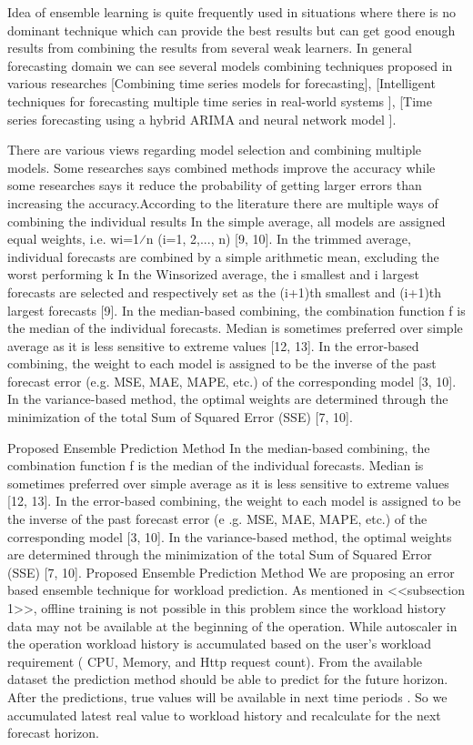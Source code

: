 Idea of ensemble learning is quite frequently used in situations where there is no dominant technique which can provide the best results but can get good enough results from combining the results from several weak learners. In general forecasting domain we can see several models combining techniques  proposed in various researches [Combining time series models for forecasting], [Intelligent techniques for forecasting multiple time series in real-world systems ],
[Time series forecasting using a hybrid ARIMA and neural network model ].  

There are various views regarding model selection and combining multiple models. Some researches says combined methods improve the accuracy while some researches says it reduce the probability of getting larger errors than increasing the accuracy.According to the literature there are multiple ways of combining the individual results 
In the simple average, all models are assigned equal weights, i.e. wi=1⁄n (i=1, 2,..., n) [9, 10].
In the trimmed average, individual forecasts are combined by a simple arithmetic mean, excluding the worst performing k%
In the Winsorized average, the i smallest and i largest forecasts are selected and respectively set as the (i+1)th smallest and (i+1)th largest forecasts [9].
In the median-based combining, the combination function f is the median of the individual forecasts. Median is sometimes preferred over simple average as it is less sensitive to extreme values [12, 13].
In the error-based combining, the weight to each model is assigned to be the inverse of the past forecast error (e.g. MSE, MAE, MAPE, etc.) of the corresponding model [3, 10].
In the variance-based method, the optimal weights are determined through the minimization of the total Sum of Squared Error (SSE) [7, 10].

Proposed Ensemble Prediction Method
In the median-based combining, the combination function f is the median of the individual forecasts. Median is 
sometimes preferred over simple average as it is less sensitive to extreme values [12, 13].
In the error-based combining, the weight to each model is assigned to be the inverse of the past forecast error (e
.g. MSE, MAE, MAPE, etc.) of the corresponding model [3, 10].
In the variance-based method, the optimal weights are determined through the minimization of the total Sum of 
Squared Error (SSE) [7, 10].
Proposed Ensemble Prediction Method
We are proposing an error based ensemble technique for workload prediction. As mentioned in <<subsection 1>>, 
offline training is not possible in this problem since the  workload history data may not be available at the 
beginning of the operation. While autoscaler in the operation workload history  is accumulated based on the user's 
workload requirement ( CPU, Memory, and Http request count). From the available dataset the prediction method 
should be able to predict for the future horizon. After the predictions, true values will be available in next time 
periods . So we accumulated latest real value to workload history and recalculate for the next forecast horizon. 
        
